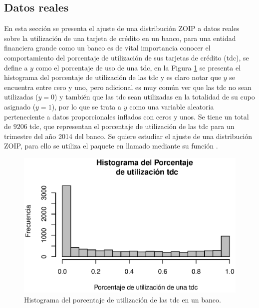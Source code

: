 \subsection{Datos reales}
En esta secci\'{o}n se presenta el ajuste de una distribuci\'{o}n ZOIP a datos reales sobre la utilizaci\'{o}n de una tarjeta de cr\'{e}dito en un banco, para una entidad financiera grande como un banco es de vital importancia conocer el comportamiento del porcentaje de utilizaci\'{o}n de sus tarjetas de cr\'{e}dito (tdc), se define a $y$ como el porcentaje de uso de una tdc, en la Figura \ref{hist_tdc} se presenta el histograma del porcentaje de utilizaci\'{o}n de las tdc y es claro notar que $y$ se encuentra entre cero y uno, pero adicional es muy com\'{u}n ver que las tdc no sean utilizadas ($y=0$) y tambi\'{e}n que las tdc sean utilizadas en la totalidad de su cupo asignado ($y=1$), por lo que se trata a $y$ como una variable aleatoria perteneciente a datos proporcionales inflados con ceros y unos. Se tiene un total de $9206$ tdc, que representan el porcentaje de utilizaci\'{o}n de las tdc para un trimestre del a\~{n}o 2014 del banco. Se quiere estudiar el ajuste de una distribuci\'{o}n ZOIP, para ello se utiliza el paquete en  llamado  mediante su funci\'{o}n .\\

\begin{figure}
	\begin{center}
		\includegraphics[scale=0.6]{Hist_tdc.eps}
		\caption{Histograma del porcentaje de utilizaci\'{o}n de las tdc en un banco.}
		\label{hist_tdc}
	\end{center}
\end{figure}


